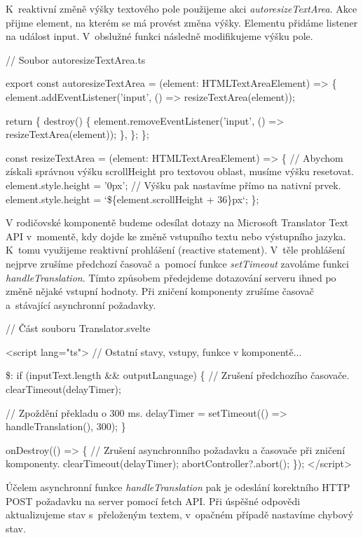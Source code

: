 K~reaktivní změně výšky textového pole použijeme akci \emph{autoresizeTextArea}. Akce přijme element, na kterém se má provést změna výšky. Elementu přidáme listener na událost input. 
V~obslužné funkci následně modifikujeme výšku pole.

\begin{prog}
// Soubor autoresizeTextArea.ts

export const autoresizeTextArea = (element: HTMLTextAreaElement) => \{
  element.addEventListener('input', () => resizeTextArea(element));

  return \{
    destroy() \{
      element.removeEventListener('input', () => resizeTextArea(element));
    \},
  \};
\};

const resizeTextArea = (element: HTMLTextAreaElement) => \{
  // Abychom získali správnou výšku scrollHeight 
    pro textovou oblast, musíme výšku resetovat.
  element.style.height = '0px';
  // Výšku pak nastavíme přímo na nativní prvek.
  element.style.height = `\$\{element.scrollHeight + 36\}px`;
\};
\end{prog}

V rodičovské komponentě budeme odesílat dotazy na Microsoft Translator Text API \cite{translatortextapi} v~momentě, kdy dojde ke změně vstupního textu nebo výstupního jazyka. 
K~tomu využijeme reaktivní prohlášení (reactive statement). V~těle prohlášení nejprve zrušíme předchozí časovač a~pomocí funkce \emph{setTimeout} zavoláme funkci \emph{handleTranslation}. 
Tímto způsobem předejdeme dotazování serveru ihned po změně nějaké vstupní hodnoty. Při zničení komponenty zrušíme časovač a~stávající asynchronní požadavky.

\begin{prog}
// Část souboru Translator.svelte

<script lang="ts">
  // Ostatní stavy, vstupy, funkce v komponentě...
  
  \$: if (inputText.length && outputLanguage) \{
    // Zrušení předchozího časovače.
    clearTimeout(delayTimer);

    // Zpoždění překladu o 300 ms.
    delayTimer = setTimeout(() => handleTranslation(), 300);
  \}

  onDestroy(() => \{
    // Zrušení asynchronního požadavku a časovače při zničení komponenty.
    clearTimeout(delayTimer);
    abortController?.abort();
  \});
</script>
\end{prog}

Účelem asynchronní funkce \emph{handleTranslation} pak je odeslání korektního HTTP POST požadavku na server pomocí fetch API. 
Při úspěšné odpovědi aktualizujeme stav s~přeloženým textem, v~opačném případě nastavíme chybový stav.

